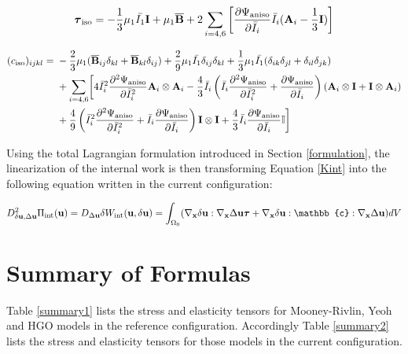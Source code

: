 \begin{appendices}
\begin{equation} \label{HGO_tauiso}
\boldsymbol{\tau}_\mathrm{iso} =  - \frac{1}{3}\mu_1\bar{I_1}\bold{I} + \mu_1{\overline{\bold{B}}}
+ 2\sum_{i = 4, 6}\left[\frac{\partial{\Psi_\mathrm{aniso}}}{\partial{\bar{I}_i}}\bar{I}_i (\bold{A}_{i} - \frac{1}{3}\bold{I})\right]
\end{equation}
 
\begin{equation} \label{HGO_spatial_ciso}
\begin{split}
(c_\mathrm{iso})_{ijkl} = {} &  - \frac{2}{3}\mu_1({\overline{\bold{B}}}_{ij}\delta_{kl} + {\overline{\bold{B}}}_{kl}\delta_{ij}) 
+ \frac{2}{9}\mu_1\bar{I_1}  \delta_{ij}\delta_{kl}
+ \frac{1}{3}\mu_1\bar{I_1} (\delta_{ik}\delta_{jl} + \delta_{il}\delta_{jk}) \\
&+ 
\sum_{i = 4, 6} \biggl[4{\bar{I}_i}^2\frac{\partial^2\Psi_\mathrm{aniso}}{\partial{\bar{I}_i}^2} \bold{A}_{i} \otimes \bold{A}_{i} - \frac{4}{3}\bar{I}_i\left(\bar{I}_i\frac{\partial^2\Psi_\mathrm{aniso}}{\partial{\bar{I}_i}^2} + \frac{\partial\Psi_\mathrm{aniso}}{\partial{\bar{I}_i}}\right)
 (\bold{A}_{i} \otimes \bold{I} + \bold{I} \otimes \bold{A}_i) \\
&+ 
\frac{4}{9}\left({\bar{I}_i}^2\frac{\partial^2\Psi_\mathrm{aniso}}{\partial{\bar{I}_i}^2} + \bar{I}_i\frac{\partial\Psi_\mathrm{aniso}}{\partial{\bar{I}_i}}\right)\bold{I} \otimes \bold{I} 
+ \frac{4}{3}\bar{I}_i \frac{\partial\Psi_\mathrm{aniso}}{\partial{\bar{I}_i}} \mathbb{I} \biggr]
\end{split}
\end{equation}

Using the total Lagrangian formulation introduced in Section \ref{formulation}, the linearization of the internal work is then transforming Equation \ref{Kint} into the following equation written in the current configuration:

\begin{equation}
D^2_{\delta\bold{u}, \Delta\bold{u}}\Pi_\mathrm{int}(\bold{u}) = D_{\Delta{\bold{u}}}\delta{W_\mathrm{int}}(\bold{u}, \delta{\bold{u}}) = \int_{\Omega_0}(\nabla_{\bold{x}}\delta\bold{u} : \nabla_{\bold{x}}\Delta\bold{u}\boldsymbol{\tau} + \nabla_{\bold{x}}\delta{\bold{u}} : \mathbb{c} :  \nabla_{\bold{x}}\Delta\bold{u})dV
\end{equation}


%
\section{Summary of Formulas}
Table \ref{summary1} lists the stress and elasticity tensors for Mooney-Rivlin, Yeoh and HGO models in the reference configuration. Accordingly Table \ref{summary2} lists the stress and elasticity tensors for those models in the current configuration.


\end{appendices}
